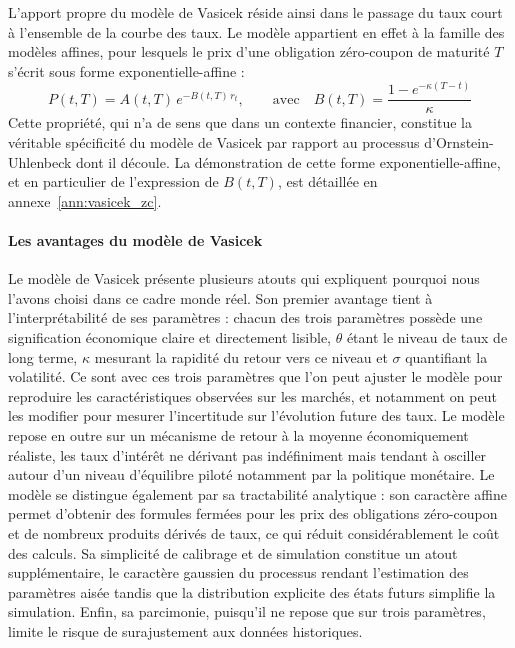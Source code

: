 L'apport propre du modèle de Vasicek réside ainsi dans le passage du taux court à l'ensemble de la courbe des taux. Le modèle appartient en effet à la famille des modèles affines, pour lesquels le prix d'une obligation zéro-coupon de maturité $T$ s'écrit sous forme exponentielle-affine :
\begin{equation}
    P(t,T) = A(t,T)\,e^{-B(t,T)\,r_t}, \qquad \text{avec} \quad B(t,T) = \frac{1 - e^{-\kappa(T-t)}}{\kappa}
    \label{eq:vasicek_zc}
\end{equation}
Cette propriété, qui n'a de sens que dans un contexte financier, constitue la véritable spécificité du modèle de Vasicek par rapport au processus d'Ornstein-Uhlenbeck dont il découle. La démonstration de cette forme exponentielle-affine, et en particulier de l'expression de $B(t,T)$, est détaillée en annexe~\ref{ann:vasicek_zc}.

\paragraph{Les avantages du modèle de Vasicek}

Le modèle de Vasicek présente plusieurs atouts qui expliquent pourquoi nous l'avons choisi dans ce cadre monde réel. 
Son premier avantage tient à l'interprétabilité de ses paramètres : chacun des trois paramètres possède une signification économique claire et directement lisible, $\theta$ étant le niveau de taux de long terme, $\kappa$ mesurant la rapidité du retour vers ce niveau et $\sigma$ quantifiant la volatilité. Ce sont avec ces trois paramètres que l'on peut ajuster le modèle pour reproduire les caractéristiques observées sur les marchés, et notamment on peut les modifier pour mesurer l'incertitude sur l'évolution future des taux.
Le modèle repose en outre sur un mécanisme de retour à la moyenne économiquement réaliste, les taux d'intérêt ne dérivant pas indéfiniment mais tendant à osciller autour d'un niveau d'équilibre piloté notamment par la politique monétaire. 
Le modèle se distingue également par sa tractabilité analytique : son caractère affine permet d'obtenir des formules fermées pour les prix des obligations zéro-coupon et de nombreux produits dérivés de taux, ce qui réduit considérablement le coût des calculs. Sa simplicité de calibrage et de simulation constitue un atout supplémentaire, le caractère gaussien du processus rendant l'estimation des paramètres aisée tandis que la distribution explicite des états futurs simplifie la simulation. Enfin, sa parcimonie, puisqu'il ne repose que sur trois paramètres, limite le risque de surajustement aux données historiques.

